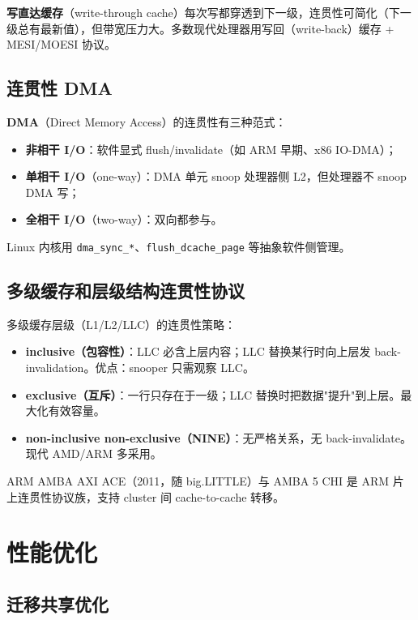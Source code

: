 \textbf{写直达缓存}（write-through cache）每次写都穿透到下一级，连贯性可简化（下一级总有最新值），但带宽压力大。多数现代处理器用写回（write-back）缓存 + MESI/MOESI 协议。

\subsection{连贯性 DMA}

\textbf{DMA}（Direct Memory Access）的连贯性有三种范式：

\begin{itemize}
\item \textbf{非相干 I/O}：软件显式 flush/invalidate（如 ARM 早期、x86 IO-DMA）；
\item \textbf{单相干 I/O}（one-way）：DMA 单元 snoop 处理器侧 L2，但处理器不 snoop DMA 写；
\item \textbf{全相干 I/O}（two-way）：双向都参与。
\end{itemize}


Linux 内核用 \texttt{dma\_sync\_*}、\texttt{flush\_dcache\_page} 等抽象软件侧管理。

\subsection{多级缓存和层级结构连贯性协议}

多级缓存层级（L1/L2/LLC）的连贯性策略：

\begin{itemize}
\item \textbf{inclusive（包容性）}：LLC 必含上层内容；LLC 替换某行时向上层发 back-invalidation。优点：snooper 只需观察 LLC。
\item \textbf{exclusive（互斥）}：一行只存在于一级；LLC 替换时把数据"提升"到上层。最大化有效容量。
\item \textbf{non-inclusive non-exclusive（NINE）}：无严格关系，无 back-invalidate。现代 AMD/ARM 多采用。
\end{itemize}


ARM AMBA AXI ACE（2011，随 big.LITTLE）与 AMBA 5 CHI 是 ARM 片上连贯性协议族，支持 cluster 间 cache-to-cache 转移。

\section{性能优化}

\subsection{迁移共享优化}

